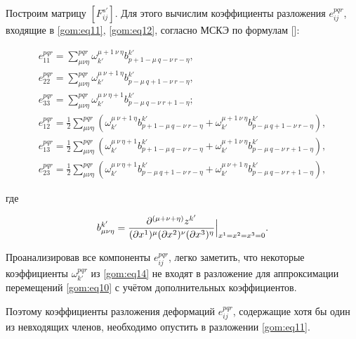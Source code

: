 Построим матрицу $[F_{ij}^{s'}]$. Для этого вычислим коэффициенты разложения $e_{ij}^{pqr}$, входящие в \eqref{gom:eq11}, \eqref{gom:eq12}, согласно МСКЭ по формулам []:

\begin{gather}

e_{11}^{pqr}=\sum_{\mu\nu\eta}^{pqr}\omega_{k'}^{\mu+1\ \nu\ \eta}b_{p+1-\mu\ q-\nu\ r-\eta}^{k'},

\\

e_{22}^{pqr}=\sum_{\mu\nu\eta}^{pqr}\omega_{k'}^{\mu\ \nu+1\ \eta}b_{p-\mu\ q+1-\nu\ r-\eta}^{k'},

\\

e_{33}^{pqr}=\sum_{\mu\nu\eta}^{pqr}\omega_{k'}^{\mu\ \nu\ \eta+1}b_{p-\mu\ q-\nu\ r+1-\eta}^{k'};

\\

e_{12}^{pqr}=\frac{1}{2}\sum_{\mu\nu\eta}^{pqr}(\omega_{k'}^{\mu\ \nu+1\ \eta}b_{p+1-\mu\ q-\nu\ r-\eta}^{k'}+\omega_{k'}^{\mu+1\ \nu\ \eta}b_{p-\mu\ q+1-\nu\ r-\eta}^{k'}),

\\

e_{13}^{pqr}=\frac{1}{2}\sum_{\mu\nu\eta}^{pqr}(\omega_{k'}^{\mu\ \nu\ \eta+1}b_{p+1-\mu\ q-\nu\ r-\eta}^{k'}+\omega_{k'}^{\mu+1\ \nu\ \eta}b_{p-\mu\ q-\nu\ r+1-\eta}^{k'}),

\label{gom:eq14}

\\

e_{23}^{pqr}=\frac{1}{2}\sum_{\mu\nu\eta}^{pqr}(\omega_{k'}^{\mu\ \nu\ \eta+1}b_{p-\mu\ q+1-\nu\ r-\eta}^{k'}+\omega_{k'}^{\mu\ \nu+1\ \eta}b_{p-\mu\ q-\nu\ r+1-\eta}^{k'}), 

\end{gather}

где 

$$b_{\mu\nu\eta}^{k'}=\frac{\partial ^{(\mu+\nu+\eta)}z^{k'}}{(\partial x^1)^{\mu}(\partial x^2)^{\nu}(\partial x^3)^{\eta}} \Bigl|_{x^1=x^2=x^3=0}.$$



Проанализировав все компоненты $e_{ij}^{pqr}$, легко заметить, что некоторые коэффициенты $\omega_{k'}^{pqr}$ из \eqref{gom:eq14} не входят в разложение для аппроксимации перемещений \eqref{gom:eq10} с учётом дополнительных коэффициентов. 

Поэтому коэффициенты разложения деформаций $e_{ij}^{pqr}$, содержащие  хотя бы один из невходящих членов, необходимо опустить в разложении \eqref{gom:eq11}. 



